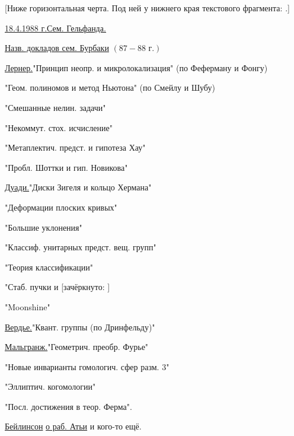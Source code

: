 [Ниже горизонтальная черта. Под ней у нижнего края текстового фрагмента: .]


\underline{18.4.1988 г.}\qquad \underline{\underline{Сем. Гельфанда.}}

\underline{Назв. докладов сем. Бурбаки} $(87-88\text{ г.})$

\underline{Лернер.}\quad "Принцип неопр. и микролокализация" (по Феферману и Фонгу)

"Геом. полиномов и метод Ньютона" (по Смейлу и Шубу)

"Смешанные нелин. задачи"

"Некоммут. стох. исчисление"

"Метаплектич. предст. и гипотеза Хау"

"Пробл. Шоттки и гип. Новикова"

\underline{Дуади.}\quad "Диски Зигеля и кольцо Хермана"

"Деформации плоских кривых"

"Большие уклонения"

"Классиф. унитарных предст. вещ. групп"

"Теория классификации"

"Стаб. пучки и [зачёркнуто: ]

"Moonshine"

\underline{Вердье.}\quad "Квант. группы (по Дринфельду)"

\underline{Мальгранж.}\quad "Геометрич. преобр. Фурье"

"Новые инварианты гомологич. сфер разм. $3$"

"Эллиптич. когомологии"

"Посл. достижения в теор. Ферма".


\underline{Бейлинсон} \underline{о раб. Атьи} и кого-то ещё.

